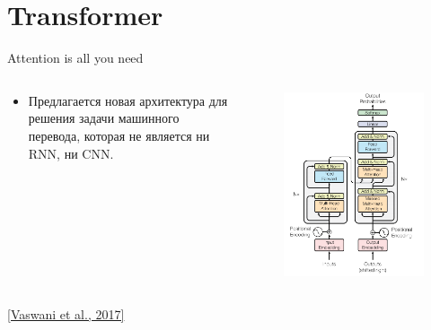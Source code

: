 \section{Transformer}
\begin{frame}[c]{Attention is all you need}
\begin{columns}[c]
	\begin{column}{0.55\textwidth}
		\begin{itemize}
			\item Предлагается новая архитектура для решения задачи машинного перевода, которая не является ни RNN, ни CNN.
		\end{itemize}
	\end{column}
	\begin{column}{0.45\textwidth}
		\begin{figure}
			\centering
			\includegraphics[width=1.0\textwidth]{figures/transformer.png}
		\end{figure}
	\end{column}
\end{columns}
\let\thefootnote\footnote{\href{https://arxiv.org/abs/1706.03762}{\color[rgb]{0.5,0.5,0.5} [Vaswani et al., 2017]}}
\end{frame}

